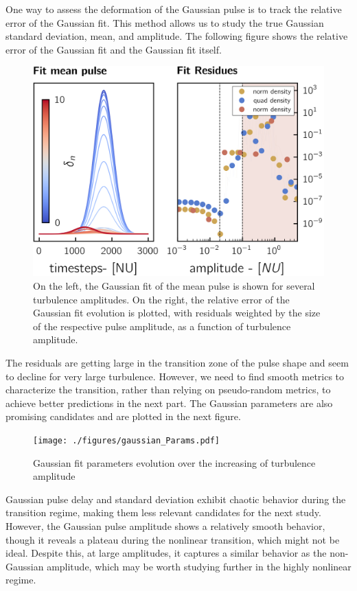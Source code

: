 \documentclass[11pt,openany]{report}
\begin{document}
\begin{multicols}{2}
    One way to assess the deformation of the Gaussian pulse is to track the relative error of the Gaussian fit. This method allows us to study the true Gaussian standard deviation, mean, and amplitude. The following figure shows the relative error of the Gaussian fit and the Gaussian fit itself.
    \begin{figure}[H]
        \centering
        \includegraphics[scale = 1]{./figures/gaussian_fit.png}
        \caption{On the left, the Gaussian fit of the mean pulse is shown for several turbulence amplitudes. On the right, the relative error of the Gaussian fit evolution is plotted, with residuals weighted by the size of the respective pulse amplitude, as a function of turbulence amplitude.}
        \label{}
    \end{figure}
    The residuals are getting large in the transition zone of the pulse shape and seem to decline for very large turbulence. However, we need to find smooth metrics to characterize the transition, rather than relying on pseudo-random metrics, to achieve better predictions in the next part. The Gaussian parameters are also promising candidates and are plotted in the next figure.
    \begin{figure}[H]
        \centering
        \texttt{[image: ./figures/gaussian\_Params.pdf]}
        \caption{Gaussian fit parameters evolution over the increasing of turbulence amplitude}
        \label{}
    \end{figure}

    Gaussian pulse delay and standard deviation exhibit chaotic behavior during the transition regime, making them less relevant candidates for the next study. However, the Gaussian pulse amplitude shows a relatively smooth behavior, though it reveals a plateau during the nonlinear transition, which might not be ideal. Despite this, at large amplitudes, it captures a similar behavior as the non-Gaussian amplitude, which may be worth studying further in the highly nonlinear regime.


\end{multicols}
\end{document}

